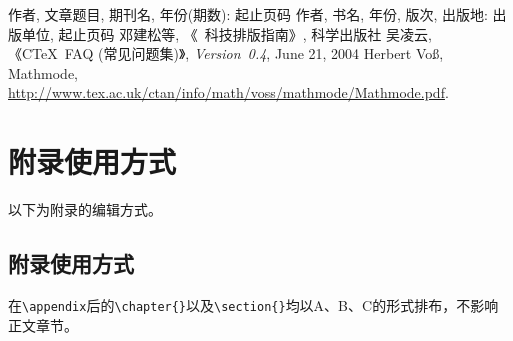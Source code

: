 \documentclass{GZHUMaster}
\begin{document}
\cleardoublepage{}
\makeatletter
\renewcommand{\@biblabel}[1]{\makebox[2em][l]{[#1]}}
\makeatother
{}
\begin{thebibliography}{0}
   作者, 文章题目, 期刊名, 年份(期数): 起止页码
   作者, 书名, 年份, 版次, 出版地: 出版单位, 起止页码
   邓建松等, 《\LaTeXe~科技排版指南》, 科学出版社
   吴凌云, 《CTeX~FAQ (常见问题集)》, \textit{Version~0.4}, June 21, 2004
   Herbert Vo\ss, Mathmode, \url{http://www.tex.ac.uk/ctan/info/math/voss/mathmode/Mathmode.pdf}.
\end{thebibliography}

\appendix
\chapter{附录使用方式}
以下为附录的编辑方式。
\section{附录使用方式}
在\verb|\appendix|后的\verb|\chapter{}|以及\verb|\section{}|均以A、B、C的形式排布，不影响正文章节。


\backmatter
\cleardoublepage
\end{document}
